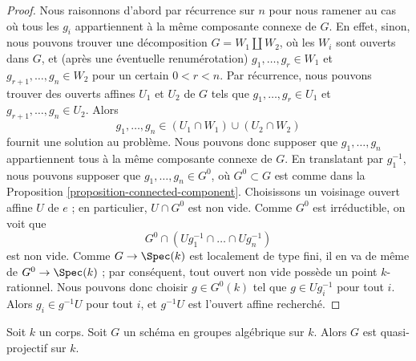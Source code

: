 \begin{proof}
Nous raisonnons d'abord par récurrence sur $n$ pour nous ramener au cas où tous les $g_i$
appartiennent à la même composante connexe de $G$. En effet, sinon, nous pouvons
trouver une décomposition $G = W_1 \amalg W_2$, où les $W_i$ sont ouverts dans $G$, et
(après une éventuelle renumérotation) $g_1, \ldots, g_r \in W_1$ et
$g_{r + 1}, \ldots, g_n \in W_2$ pour un certain $0 < r < n$. Par
récurrence, nous pouvons trouver des ouverts affines $U_1$ et $U_2$ de $G$ tels que
$g_1, \ldots, g_r \in U_1$ et $g_{r + 1}, \ldots, g_n \in U_2$.
Alors
$$
g_1, \ldots, g_n \in (U_1 \cap W_1) \cup (U_2 \cap W_2)
$$
fournit une solution au problème. Nous pouvons donc supposer que $g_1, \ldots, g_n$
appartiennent tous à la même composante connexe de $G$. En translatant par $g_1^{-1}$,
nous pouvons supposer que $g_1, \ldots, g_n \in G^0$, où $G^0 \subset G$ est comme dans la
Proposition \ref{proposition-connected-component}. Choisissons un voisinage
ouvert affine $U$ de $e$ ; en particulier, $U \cap G^0$ est non vide.
Comme $G^0$ est irréductible, on voit que
$$
G^0 \cap (Ug_1^{-1} \cap \ldots \cap Ug_n^{-1})
$$
est non vide. Comme $G \to \Spec(k)$ est localement de type fini, il en va de même de
$G^0 \to \Spec(k)$ ; par conséquent, tout ouvert non vide
possède un point $k$-rationnel. Nous pouvons donc choisir $g \in G^0(k)$ tel que
$g \in Ug_i^{-1}$ pour tout $i$. Alors $g_i \in g^{-1}U$ pour tout $i$,
et $g^{-1}U$ est l'ouvert affine recherché.
\end{proof}

\begin{lemma}
\label{lemma-algebraic-quasi-projective}
Soit $k$ un corps. Soit $G$ un schéma en groupes algébrique sur $k$.
Alors $G$ est quasi-projectif sur $k$.
\end{lemma}

